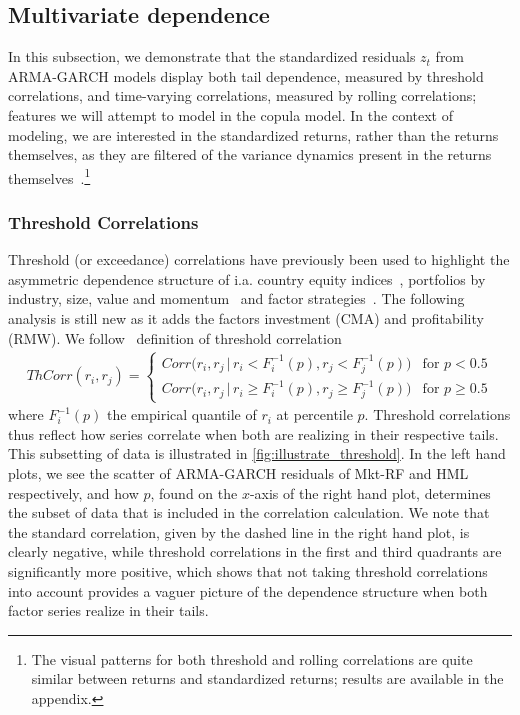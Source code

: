 
\subsection{Multivariate dependence} %

In this subsection, we demonstrate that the standardized residuals ${z_t}$ from ARMA-GARCH models display both tail dependence, measured by threshold correlations, and time-varying correlations, measured by rolling correlations; features we will attempt to model in the copula model. In the context of modeling, we are interested in the standardized returns, rather than the returns themselves, as they are filtered of the variance dynamics present in the returns themselves~\autocite{ChristoffersenLanglois2013}.\footnote{The visual patterns for both threshold and rolling correlations are quite similar between returns and standardized returns; results are available in the appendix.}

\subsubsection{Threshold Correlations}

Threshold (or exceedance) correlations have previously been used to highlight the asymmetric dependence structure of i.a. country equity indices~\autocite{LonginSolnik2001}, portfolios by industry, size, value and momentum~\autocite{AngChen2002} and factor strategies~\autocite{ChristoffersenLanglois2013}. The following analysis is still new as it adds the factors investment (CMA) and profitability (RMW). We follow~\textcite{ChristoffersenLanglois2013} definition of threshold correlation
\begin{align}
    ThCorr(r_i, r_j) = 
    \begin{cases} 
        Corr\Big(r_i, r_j \,|\, r_i < F_i^{-1}(p), r_j < F_j^{-1}(p)\Big)  & \text{for } p < 0.5 \\
        Corr\Big(r_i, r_j \,|\, r_i \geq F_i^{-1}(p), r_j \geq F_j^{-1}(p)\Big)  & \text{for } p \geq 0.5
    \end{cases}
\end{align}
where $F_i^{-1}(p)$ the empirical quantile of $r_i$ at percentile $p$. Threshold correlations thus reflect how series correlate when both are realizing in their respective tails. This subsetting of data is illustrated in \autoref{fig:illustrate_threshold}. In the left hand plots, we see the scatter of ARMA-GARCH residuals of Mkt-RF and HML respectively, and how $p$, found on the $x$-axis of the right hand plot, determines the subset of data that is included in the correlation calculation. We note that the standard correlation, given by the dashed line in the right hand plot, is clearly negative, while threshold correlations in the first and third quadrants are significantly more positive, which shows that not taking threshold correlations into account provides a vaguer picture of the dependence structure when both factor series realize in their tails.

